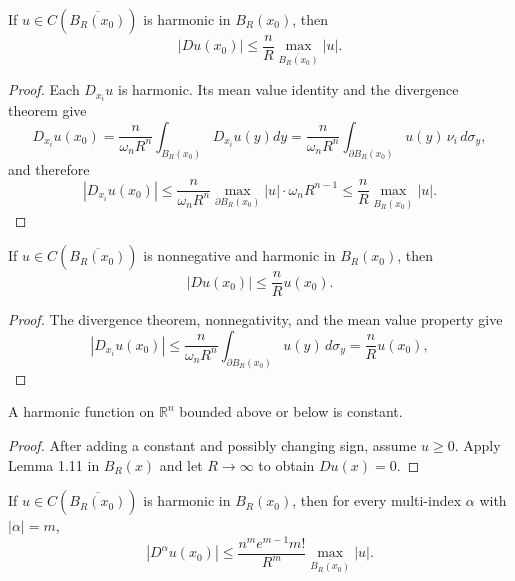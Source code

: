 \begin{lemma}\label{hanlin:lemma-interior-gradient-1}
If $u \in C(\overline{B_R(x_0)})$ is harmonic in $B_R(x_0)$, then
\[
|Du(x_0)| \le \frac{n}{R} \max_{\overline{B_R(x_0)}} |u|.
\]
\end{lemma}

\begin{proof}
\sketch Each $D_{x_i}u$ is harmonic. Its mean value identity and the divergence
theorem give
\[
D_{x_i}u(x_0) = \frac{n}{\omega_n R^n}\int_{B_R(x_0)} D_{x_i}u(y)dy = \frac{n}{\omega_n R^n}\int_{\partial B_R(x_0)} u(y)\,\nu_i\,d\sigma_y,
\]
and therefore
\[
|D_{x_i}u(x_0)| \le \frac{n}{\omega_n R^n}\max_{\partial B_R(x_0)} |u| \cdot \omega_n R^{n-1} \le \frac{n}{R}\max_{\overline{B_R(x_0)}} |u|.
\]
\end{proof}

\begin{lemma}\label{hanlin:lemma-interior-gradient-2}
If $u \in C(\overline{B_R(x_0)})$ is nonnegative and harmonic in $B_R(x_0)$,
then
\[
|Du(x_0)| \le \frac{n}{R}u(x_0).
\]
\end{lemma}

\begin{proof}
\sketch The divergence theorem, nonnegativity, and the mean value property give
\[
|D_{x_i}u(x_0)| \le \frac{n}{\omega_n R^n}\int_{\partial B_R(x_0)} u(y)\,d\sigma_y = \frac{n}{R}u(x_0),
\]
\end{proof}

\begin{corollary}\label{hanlin:corollary-liouville}
A harmonic function on $\mathbb{R}^n$ bounded above or below is constant.
\end{corollary}

\begin{proof}
\sketch After adding a constant and possibly changing sign, assume $u\ge0$.
Apply Lemma 1.11 in $B_R(x)$ and let $R\to\infty$ to obtain $Du(x)=0$.
\end{proof}

\begin{lemma}\label{hanlin:lemma-higher-derivative-estimate}
If $u \in C(\overline{B_R(x_0)})$ is harmonic in $B_R(x_0)$, then for every
multi-index $\alpha$ with $|\alpha|=m$,
\[
|D^\alpha u(x_0)| \le \frac{n^m e^{m-1}m!}{R^m}\max_{\overline{B_R(x_0)}} |u|.
\]
\end{lemma}


